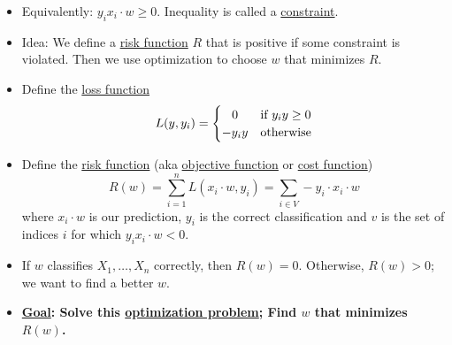 \documentclass[10pt]{article}
\begin{document}
\begin{description}
\begin{itemize}
			 \item Equivalently: $y_{i}x_{i} \cdot w \geq 0$. Inequality is called a \underline{constraint}.
			 
			 \item Idea: We define a \underline{risk function} $R$ that is positive if some constraint is violated. Then we use optimization to choose $w$ that minimizes $R$.
			 
			 \item Define the \underline{loss function}
			 	\[
 					L(y, y_{i}) = \left\{\def\arraystretch{1.2}%
 						\begin{array}{@{}c@{\quad}l@{}}
    						0 & \text{if $y_{i}y \geq 0 $}\\
    						-y_{i}y & \text{otherwise}\\
  						\end{array}\right.
				\]
			
			\item Define the \underline{risk function} (aka \underline{objective function} or \underline{cost function})
				$$ R(w) = \sum_{i=1}^{n} L(x_{i} \cdot w, y_{i}) = 
					\sum_{i \in V} -y_{i} \cdot x_{i} \cdot w $$
				where $x_{i} \cdot w$ is our prediction, $y_{i}$ is the correct classification and $v$ is the set of indices $i$ for which $y_{i}x_{i} \cdot w < 0$.
			\item If $w$ classifies $X_{1}, \dots, X_{n}$ correctly, then $R(w) = 0$. Otherwise, $R(w) > 0$; we want to find a better $w$.
			
			\item \textbf{\underline{Goal}: Solve this \underline{optimization problem}; Find $w$ that minimizes $R(w)$.}
	\end{itemize}
\end{description}

\newpage
\end{document}
